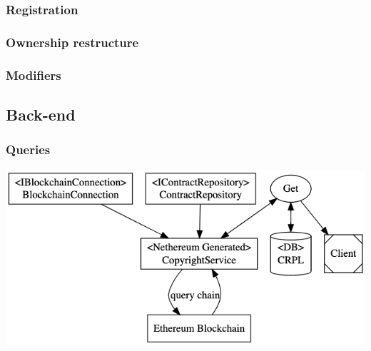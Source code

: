 \documentclass[12pt]{article}
\begin{document}
\subsubsection{Registration}

\subsubsection{Ownership restructure}

\subsubsection{Modifiers}

\subsection{Back-end}

\subsubsection{Queries}
\includegraphics[width=\textwidth,height=\textheight,keepaspectratio]{images/operational/chain-inject}
\end{document}
